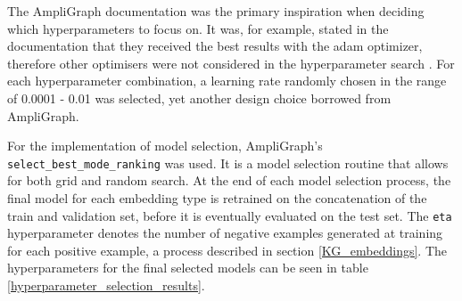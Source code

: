 The AmpliGraph documentation was the primary inspiration when deciding which hyperparameters to focus on. It was, for example, stated in the documentation that they received the best results with the adam optimizer, therefore other optimisers were not considered in the hyperparameter search \cite{ampligraph_documentation}. For each hyperparameter combination, a learning rate randomly chosen in the range of 0.0001 - 0.01 was selected, yet another design choice borrowed from AmpliGraph.

For the implementation of model selection, AmpliGraph's \texttt{select\_best\_mode\_ranking} was used. It is a model selection routine that allows for both grid and random search. At the end of each model selection process, the final model for each embedding type is retrained on the concatenation of the train and validation set, before it is eventually evaluated on the test set. The \texttt{eta} hyperparameter denotes the number of negative examples generated at training for each positive example, a process described in section \ref{KG_embeddings}. The hyperparameters for the final selected models can be seen in table \ref{hyperparameter_selection_results}. %

